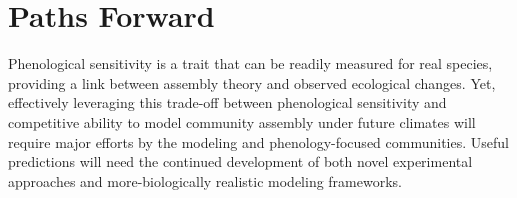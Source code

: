 \documentclass{article}[12pt]
\begin{document}



\section{Paths Forward}
Phenological sensitivity is a trait that can be readily measured for real species, providing a link between assembly theory and observed ecological changes. Yet, effectively leveraging this trade-off between phenological sensitivity and competitive ability to model community assembly under future climates will require major efforts by the modeling and phenology-focused communities. Useful predictions will need the continued development of both novel experimental approaches and more-biologically realistic modeling frameworks. %
\end{document}
